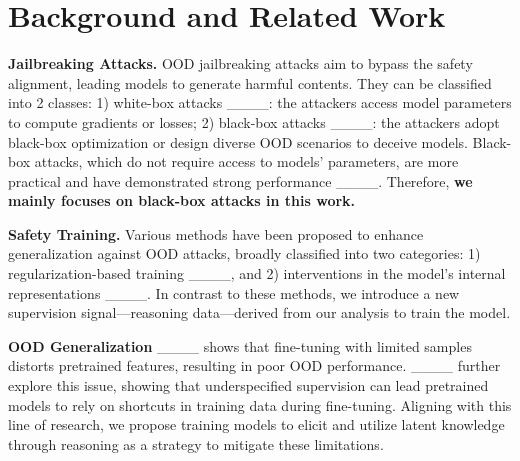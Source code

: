 \section{Background and Related Work}
\vspace{-0.03cm}
\textbf{Jailbreaking Attacks.}  OOD jailbreaking attacks aim to bypass the safety alignment, leading models to generate harmful contents. They can be classified into 2 classes: 1) white-box attacks ____: the attackers access model parameters to compute gradients or losses; 2) black-box attacks ____: the attackers adopt black-box optimization or design diverse OOD scenarios to deceive models. Black-box attacks, which do not require access to models' parameters, are more practical and have demonstrated strong performance ____. Therefore, \textbf{we mainly focuses on black-box attacks in this work.}



\vspace{-0.13cm}
\textbf{Safety Training.} Various methods have been proposed to enhance generalization against OOD attacks, broadly classified into two categories: 1) regularization-based training ____, and 2) interventions in the model’s internal representations ____. In contrast to these methods, we introduce a new supervision signal—reasoning data—derived from our analysis to train the model. 

\vspace{-0.13cm}
\textbf{OOD Generalization} ____ shows that fine-tuning with limited samples distorts pretrained features, resulting in poor OOD performance. ____ further explore this issue, showing that underspecified supervision can lead pretrained models to rely on shortcuts in training data during fine-tuning. Aligning with this line of research, we propose training models to elicit and utilize latent knowledge through reasoning as a strategy to mitigate these limitations.

